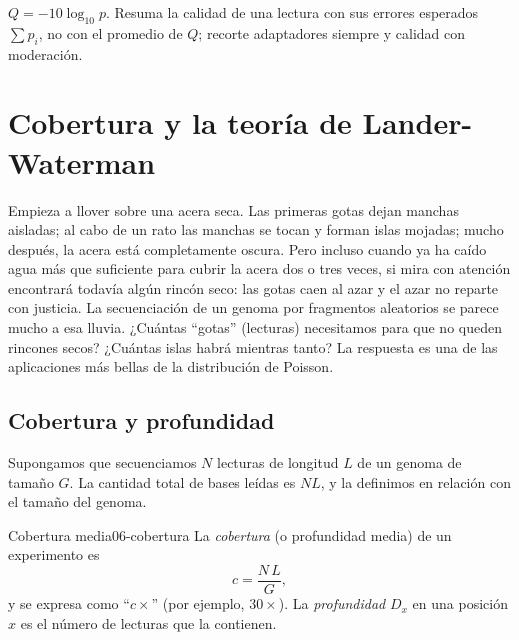 \begin{ideaclave}
$Q=-10\log_{10}p$. Resuma la calidad de una lectura con sus errores esperados $\sum p_i$, no con el promedio de $Q$; recorte adaptadores siempre y calidad con moderación.
\end{ideaclave}


\section{Cobertura y la teoría de Lander-Waterman}\label{sec:06-cobertura}

\begin{intuicion}
Empieza a llover sobre una acera seca. Las primeras gotas dejan manchas aisladas; al cabo de un rato las manchas se tocan y forman islas mojadas; mucho después, la acera está completamente oscura. Pero incluso cuando ya ha caído agua más que suficiente para cubrir la acera dos o tres veces, si mira con atención encontrará todavía algún rincón seco: las gotas caen al azar y el azar no reparte con justicia. La secuenciación de un genoma por fragmentos aleatorios se parece mucho a esa lluvia. ¿Cuántas ``gotas'' (lecturas) necesitamos para que no queden rincones secos? ¿Cuántas islas habrá mientras tanto? La respuesta es una de las aplicaciones más bellas de la distribución de Poisson.
\end{intuicion}

\subsection{Cobertura y profundidad}

Supongamos que secuenciamos $N$ lecturas de longitud $L$ de un genoma de tamaño $G$. La cantidad total de bases leídas es $NL$, y la definimos en relación con el tamaño del genoma.

\begin{definicion}{Cobertura media}{06-cobertura}
La \emph{cobertura} (o profundidad media) de un experimento es
\begin{equation}\label{eq:06-cobertura}
c = \frac{N\,L}{G},
\end{equation}
y se expresa como ``$c\times$'' (por ejemplo, $30\times$). La \emph{profundidad} $D_x$ en una posición $x$ es el número de lecturas que la contienen.
\end{definicion}

